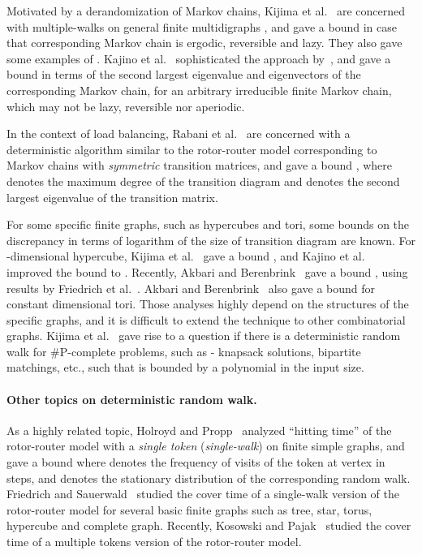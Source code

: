 \documentclass[letter, 11pt]{article}
\newcommand{\1}{\mbox{1}\hspace{-0.25em}\mbox{l}}
\begin{document}
Motivated by a derandomization of Markov chains, 
 Kijima et al.~\cite{KKM12} are concerned with multiple-walks 
  on general finite multidigraphs , and 
  gave a bound  
  in case that corresponding Markov chain is ergodic, reversible and lazy. 
 They also gave some examples of . 
Kajino et al.~\cite{KKM13} 
  sophisticated the approach by~\cite{KKM12}, and 
  gave a bound in terms of the second largest eigenvalue and eigenvectors of the corresponding Markov chain, 
  for an arbitrary irreducible finite Markov chain, 
    which may not be lazy, reversible nor aperiodic. 

 In the context of load balancing, 
  Rabani et al.~\cite{RSW98} are concerned with a deterministic algorithm 
  similar to the rotor-router model corresponding to Markov chains with {\em symmetric} transition matrices, and 
  gave a bound , where 
    denotes the maximum degree of the transition diagram and 
    denotes the second largest eigenvalue of the transition matrix.  

For some specific finite graphs, 
  such as hypercubes and tori, some bounds on the discrepancy in terms of logarithm of the size of transition diagram 
  are known. 
For -dimensional hypercube, 
  Kijima et al.~\cite{KKM12} gave a bound , and 
  Kajino et al.~\cite{KKM13} improved the bound to . 
Recently, 
  Akbari and Berenbrink~\cite{AB13} gave a bound , 
  using results by Friedrich et al.~\cite{FGS12}. 
Akbari and Berenbrink~\cite{AB13} also gave a bound  
  for constant dimensional tori.  
Those analyses highly depend on the structures of the specific graphs, and 
it is difficult to extend the technique to other combinatorial graphs.  
Kijima et al.~\cite{KKM12} gave rise to a question 
  if there is a deterministic random walk 
   for {\#}P-complete problems, such as - knapsack solutions, bipartite matchings, etc., 
  such that  is bounded by a polynomial in the input size.  

\paragraph{Other topics on deterministic random walk.}
As a highly related topic, 
 Holroyd and Propp~\cite{HP10} analyzed 
   ``hitting time'' of the rotor-router model 
   with a {\em single token} ({\em single-walk}) on finite simple graphs, and  
  gave a bound  
  where  denotes the frequency of visits of the token at vertex  in  steps, and 
   denotes the stationary distribution of the corresponding random walk. 
Friedrich and Sauerwald~\cite{FS10} 
   studied the cover time of a single-walk version of the rotor-router model 
   for several basic finite graphs such as tree, star, torus, hypercube and complete graph. 
Recently, Kosowski and Pajak~\cite{KP14} studied the cover time of a multiple tokens version of the rotor-router model. 
\end{document}
